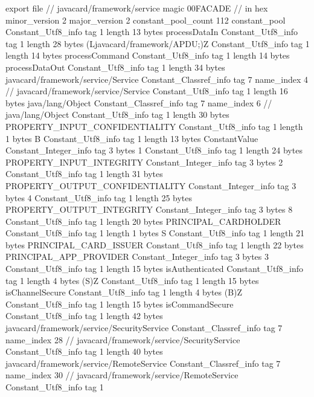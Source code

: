 export file {		// javacard/framework/service
	magic	00FACADE		 // in hex
	minor_version	2
	major_version	2
	constant_pool_count	112
	constant_pool {
		Constant_Utf8_info {
			tag	1
			length	13
			bytes	processDataIn
		}
		Constant_Utf8_info {
			tag	1
			length	28
			bytes	(Ljavacard/framework/APDU;)Z
		}
		Constant_Utf8_info {
			tag	1
			length	14
			bytes	processCommand
		}
		Constant_Utf8_info {
			tag	1
			length	14
			bytes	processDataOut
		}
		Constant_Utf8_info {
			tag	1
			length	34
			bytes	javacard/framework/service/Service
		}
		Constant_Classref_info {
			tag	7
			name_index	4		// javacard/framework/service/Service
		}
		Constant_Utf8_info {
			tag	1
			length	16
			bytes	java/lang/Object
		}
		Constant_Classref_info {
			tag	7
			name_index	6		// java/lang/Object
		}
		Constant_Utf8_info {
			tag	1
			length	30
			bytes	PROPERTY_INPUT_CONFIDENTIALITY
		}
		Constant_Utf8_info {
			tag	1
			length	1
			bytes	B
		}
		Constant_Utf8_info {
			tag	1
			length	13
			bytes	ConstantValue
		}
		Constant_Integer_info {
			tag	3
			bytes	1
		}
		Constant_Utf8_info {
			tag	1
			length	24
			bytes	PROPERTY_INPUT_INTEGRITY
		}
		Constant_Integer_info {
			tag	3
			bytes	2
		}
		Constant_Utf8_info {
			tag	1
			length	31
			bytes	PROPERTY_OUTPUT_CONFIDENTIALITY
		}
		Constant_Integer_info {
			tag	3
			bytes	4
		}
		Constant_Utf8_info {
			tag	1
			length	25
			bytes	PROPERTY_OUTPUT_INTEGRITY
		}
		Constant_Integer_info {
			tag	3
			bytes	8
		}
		Constant_Utf8_info {
			tag	1
			length	20
			bytes	PRINCIPAL_CARDHOLDER
		}
		Constant_Utf8_info {
			tag	1
			length	1
			bytes	S
		}
		Constant_Utf8_info {
			tag	1
			length	21
			bytes	PRINCIPAL_CARD_ISSUER
		}
		Constant_Utf8_info {
			tag	1
			length	22
			bytes	PRINCIPAL_APP_PROVIDER
		}
		Constant_Integer_info {
			tag	3
			bytes	3
		}
		Constant_Utf8_info {
			tag	1
			length	15
			bytes	isAuthenticated
		}
		Constant_Utf8_info {
			tag	1
			length	4
			bytes	(S)Z
		}
		Constant_Utf8_info {
			tag	1
			length	15
			bytes	isChannelSecure
		}
		Constant_Utf8_info {
			tag	1
			length	4
			bytes	(B)Z
		}
		Constant_Utf8_info {
			tag	1
			length	15
			bytes	isCommandSecure
		}
		Constant_Utf8_info {
			tag	1
			length	42
			bytes	javacard/framework/service/SecurityService
		}
		Constant_Classref_info {
			tag	7
			name_index	28		// javacard/framework/service/SecurityService
		}
		Constant_Utf8_info {
			tag	1
			length	40
			bytes	javacard/framework/service/RemoteService
		}
		Constant_Classref_info {
			tag	7
			name_index	30		// javacard/framework/service/RemoteService
		}
		Constant_Utf8_info {
			tag	1
}}}
